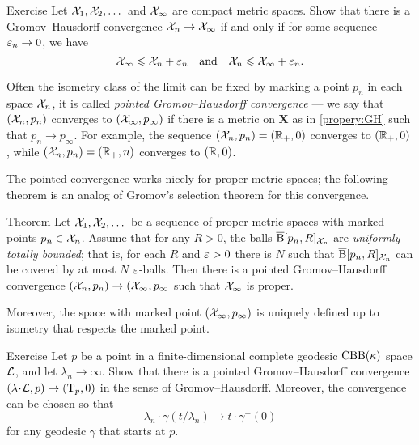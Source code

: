 \begin{thm}{Exercise}\label{ex:GH-po}
Let $\mathcal{X}_1,\mathcal{X}_2,\dots$ and $\mathcal{X}_\infty$ are compact metric spaces.
Show that there is a Gromov--Hausdorff convergence $\mathcal{X}_n\to\mathcal{X}_\infty$ if and only if for some sequence $\varepsilon_n\to 0$,
we have 
\[\mathcal{X}_\infty\leqslant \mathcal{X}_n+\varepsilon_n\quad\text{and}\quad \mathcal{X}_n\leqslant \mathcal{X}_\infty+\varepsilon_n.\]
\end{thm}

Often the isometry class of the limit can be fixed by marking a point $p_n$ in each space $\mathcal{X}_n$, it is called \emph{pointed Gromov--Hausdorff convergence} --- we say that $(\mathcal{X}_n,p_n)$ converges to $(\mathcal{X}_\infty,p_\infty)$ if there is a metric on $\bm{X}$ as in \ref{propery:GH} such that $p_n\to p_\infty$.
For example, the sequence $(\mathcal{X}_n,p_n)=(\mathbb{R}_+,0)$ converges to $(\mathbb{R}_+,0)$, while $(\mathcal{X}_n,p_n)=(\mathbb{R}_+,n)$ converges to $(\mathbb{R},0)$.

The pointed convergence works nicely for proper metric spaces;
the following theorem is an analog of Gromov's selection theorem for this convergence.

\begin{thm}{Theorem}\label{thm:pointed-gromov-compactness}
Let $\mathcal{X}_1,\mathcal{X}_2,\dots$ be a sequence of proper metric spaces with marked points $p_n\in\mathcal{X}_n$.
Assume that for any $R>0$, the balls $\overline{\mathrm{B}}{}[p_n,R]_{\mathcal{X}_n}$ are \emph{uniformly totally bounded};
that is, for each $R$ and $\varepsilon>0$ there is $N$ such that $\overline{\mathrm{B}}{}[p_n,R]_{\mathcal{X}_n}$ can be covered by at most $N$ $\varepsilon$-balls.
Then there is a pointed Gromov--Hausdorff convergence $(\mathcal{X}_n,p_n)\to (\mathcal{X}_\infty,p_\infty$ such that $\mathcal{X}_\infty$ is proper.

Moreover, the space with marked point $(\mathcal{X}_\infty,p_\infty)$ is uniquely defined up to isometry that respects the marked point.
\end{thm}

\begin{thm}{Exercise}\label{ex:GHto-tangent}
Let $p$ be a point in a finite-dimensional complete geodesic $\mathrm{CBB}(\kappa)$ space $\mathcal{L}$,
and let $\lambda_n\to\infty$.
Show that there is a pointed Gromov--Hausdorff convergence $(\lambda\cdot \spc{L},p)\z\to (\T_p,0)$ in the sense of Gromov--Hausdorff.
Moreover, the convergence can be chosen so that  
\[\lambda_n\cdot \gamma(t/\lambda_n)\to t\cdot \gamma^+(0)\]
for any geodesic $\gamma$ that starts at $p$. 
\end{thm}


